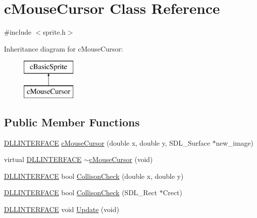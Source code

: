 \hypertarget{classc_mouse_cursor}{\section{c\-Mouse\-Cursor Class Reference}
\label{classc_mouse_cursor}
}


{\ttfamily \#include $<$sprite.\-h$>$}

Inheritance diagram for c\-Mouse\-Cursor\-:\begin{figure}[H]
\begin{center}
\leavevmode
\includegraphics[height=2.000000cm]{classc_mouse_cursor}
\end{center}
\end{figure}
\subsection*{Public Member Functions}
\begin{DoxyCompactItemize}
\item 
\hyperlink{_s_d_l__ep_8h_a38dd54df4631b4daf553096353d7b20b}{D\-L\-L\-I\-N\-T\-E\-R\-F\-A\-C\-E} \hyperlink{classc_mouse_cursor_a5a6eadd260448149ae4bfe88c1cd5594}{c\-Mouse\-Cursor} (double x, double y, S\-D\-L\-\_\-\-Surface $\ast$new\-\_\-image)
\item 
virtual \hyperlink{_s_d_l__ep_8h_a38dd54df4631b4daf553096353d7b20b}{D\-L\-L\-I\-N\-T\-E\-R\-F\-A\-C\-E} \hyperlink{classc_mouse_cursor_ae4c8eaeee79723d1476b1ef41188863c}{$\sim$c\-Mouse\-Cursor} (void)
\item 
\hyperlink{_s_d_l__ep_8h_a38dd54df4631b4daf553096353d7b20b}{D\-L\-L\-I\-N\-T\-E\-R\-F\-A\-C\-E} bool \hyperlink{classc_mouse_cursor_aacaaacfd4630504c4418e159bdd8aeba}{Collison\-Check} (double x, double y)
\item 
\hyperlink{_s_d_l__ep_8h_a38dd54df4631b4daf553096353d7b20b}{D\-L\-L\-I\-N\-T\-E\-R\-F\-A\-C\-E} bool \hyperlink{classc_mouse_cursor_aba42d6de0d7be8daedef53d5a47018bc}{Collison\-Check} (S\-D\-L\-\_\-\-Rect $\ast$Crect)
\item 
\hyperlink{_s_d_l__ep_8h_a38dd54df4631b4daf553096353d7b20b}{D\-L\-L\-I\-N\-T\-E\-R\-F\-A\-C\-E} void \hyperlink{classc_mouse_cursor_aa63dd0498aacf4cb6212dff7f3c0cfcb}{Update} (void)
\end{DoxyCompactItemize}

